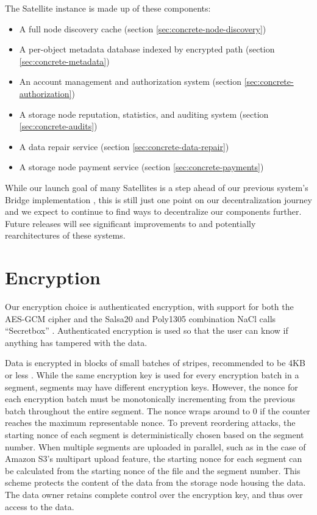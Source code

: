 \documentclass[8pt,fleqn,openany]{book}
\begin{document}
The Satellite instance is made up of these components:
\begin{itemize}
\item A full node discovery cache (section \ref{sec:concrete-node-discovery})
\item A per-object metadata database indexed by encrypted path
  (section \ref{sec:concrete-metadata})
\item An account management and authorization system
  (section \ref{sec:concrete-authorization})
\item A storage node reputation, statistics, and auditing system
  (section \ref{sec:concrete-audits})
\item A data repair service (section \ref{sec:concrete-data-repair})
\item A storage node payment service (section \ref{sec:concrete-payments})
\end{itemize}

While our launch goal of many Satellites is a step ahead of our previous
system's Bridge implementation \cite{storj-v2}, this is still just one point on
our decentralization journey and we expect to continue to find ways to
decentralize our components further.
Future releases will see significant improvements to and potentially
rearchitectures of these systems.

\section{Encryption}\label{sec:concrete-encryption}

Our encryption choice is authenticated encryption, with support for both the
AES-GCM cipher and the Salsa20 and Poly1305 combination NaCl calls ``Secretbox''
\cite{nacl-crypto}. Authenticated encryption is used so that the user can know
if anything has tampered with the data.

Data is encrypted in blocks of small batches of stripes, recommended to be
4KB or less \cite{nacl-packetlen}. While the same encryption key is used for
every encryption batch in a segment, segments may have
different encryption keys. However, the nonce for each encryption
batch must be monotonically incrementing from the previous batch throughout the
entire segment. The nonce wraps around to 0 if the counter reaches the
maximum representable nonce.
To prevent reordering attacks, the starting nonce of each
segment is deterministically chosen based on the segment number.
When multiple segments are uploaded in parallel, such as in the case of
Amazon S3's multipart upload feature, the starting nonce for each segment can be
calculated from the starting nonce of the file and the segment number.
This scheme protects the
content of the data from the storage node housing the data. The data owner
retains complete control over the encryption key, and thus over access to the
data.
\end{document}
